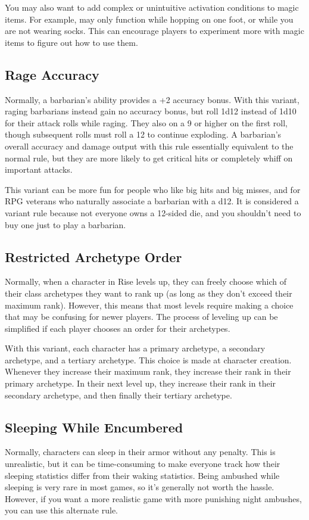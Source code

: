     You may also want to add complex or unintuitive activation conditions to magic items.
    For example,  may only function while hopping on one foot, or while you are not wearing socks.
    This can encourage players to experiment more with magic items to figure out how to use them.

  \subsection{Rage Accuracy}
    Normally, a barbarian's  ability provides a +2 accuracy bonus.
    With this variant, raging barbarians instead gain no accuracy bonus, but roll 1d12 instead of 1d10 for their attack rolls while raging.
    They also  on a 9 or higher on the first roll, though subsequent rolls must roll a 12 to continue exploding.
    A barbarian's overall accuracy and damage output with this rule essentially equivalent to the normal rule, but they are more likely to get critical hits or completely whiff on important attacks.

    This variant can be more fun for people who like big hits and big misses, and for RPG veterans who naturally associate a barbarian with a d12.
    It is considered a variant rule because not everyone owns a 12-sided die, and you shouldn't need to buy one just to play a barbarian.

  \subsection{Restricted Archetype Order}
    Normally, when a character in Rise levels up, they can freely choose which of their class archetypes they want to rank up (as long as they don't exceed their maximum rank).
    However, this means that most levels require making a choice that may be confusing for newer players.
    The process of leveling up can be simplified if each player chooses an order for their archetypes.

    With this variant, each character has a primary archetype, a secondary archetype, and a tertiary archetype.
    This choice is made at character creation.
    Whenever they increase their maximum rank, they increase their rank in their primary archetype.
    In their next level up, they increase their rank in their secondary archetype, and then finally their tertiary archetype.

  \subsection{Sleeping While Encumbered}
    Normally, characters can sleep in their armor without any penalty.
    This is unrealistic, but it can be time-consuming to make everyone track how their sleeping statistics differ from their waking statistics.
    Being ambushed while sleeping is very rare in most games, so it's generally not worth the hassle.
    However, if you want a more realistic game with more punishing night ambushes, you can use this alternate rule.

